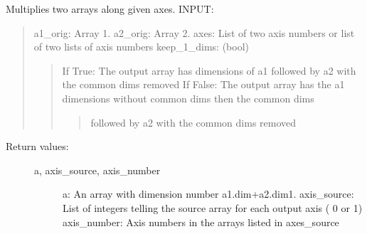 \documentclass[letterpaper,10pt,english]{sphinxmanual}
\begin{document}
\begin{fulllineitems}
\label{\detokenize{tools:flap.tools.multiply_along_axes}}
Multiplies two arrays along given axes.
INPUT:
\begin{quote}

a1\_orig: Array 1.
a2\_orig: Array 2.
axes: List of two axis numbers or list of two lists of axis numbers
keep\_1\_dims: (bool)
\begin{quote}

If True: The output array has dimensions of a1 followed by a2 with the common dims removed
If False: The output array has the a1 dimensions without common dims then the common dims
\begin{quote}

followed by a2 with the common dims removed
\end{quote}
\end{quote}
\end{quote}
\begin{description}
\item[{Return values:}] \leavevmode\begin{description}
\item[{a, axis\_source, axis\_number}] \leavevmode
a: An array with dimension number a1.dim+a2.dim\sphinxhyphen{}1.
axis\_source: List of integers telling the source array for each output axis ( 0 or 1)
axis\_number: Axis numbers in the arrays listed in axes\_source

\end{description}

\end{description}

\end{fulllineitems}

\end{document}
